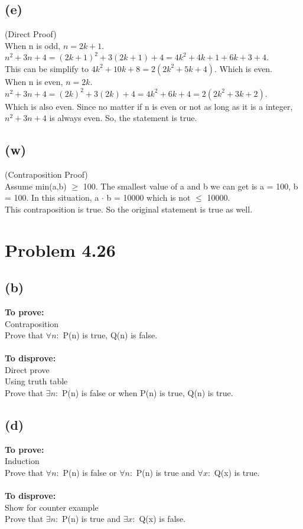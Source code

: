 \documentclass{article}
\begin{document}
\subsection*{(e)}
(Direct Proof)\\
When n is odd, $n = 2k+1$.\\
$n^2+3n+4 = (2k+1)^2+3(2k+1)+4 = 4k^2+4k+1+6k+3+4$.\\
This can be simplify to $4k^2+10k+8 = 2(2k^2+5k+4)$. Which is even.\\
When n is even, $n = 2k$.\\
$n^2+3n+4 = (2k)^2+3(2k)+4 = 4k^2+6k+4 = 2(2k^2+3k+2)$.\\
Which is also even. Since no matter if n is even or not as long as it is a integer, $n^2+3n+4$ is always even. So, the statement is true. \\

\subsection*{(w)}
(Contraposition Proof)\\
Assume min(a,b) $\geq$ 100. The smallest value of a and b we can get is a = 100, b = 100. In this situation, a $\cdot$ b = 10000 which is not $\leq$ 10000.\\
This contraposition is true. So the original statement is true as well.


\newpage
\section*{Problem 4.26}
\subsection*{(b)}
\textbf{To prove:}\\
Contraposition\\
Prove that $\forall n: $ P(n) is true, Q(n) is false.\\\\
\textbf{To disprove:}\\
Direct prove\\
Using truth table\\
Prove that $\exists n: $ P(n) is false or when P(n) is true, Q(n) is true.\\
\subsection*{(d)}
\textbf{To prove:}\\
Induction\\
Prove that $\forall n: $ P(n) is false or $\forall n: $ P(n) is true and $\forall x: $ Q(x) is true.\\\\
\textbf{To disprove:}\\
Show for counter example\\
Prove that $\exists n: $ P(n) is true and $\exists x: $ Q(x) is false.\\
\end{document}
